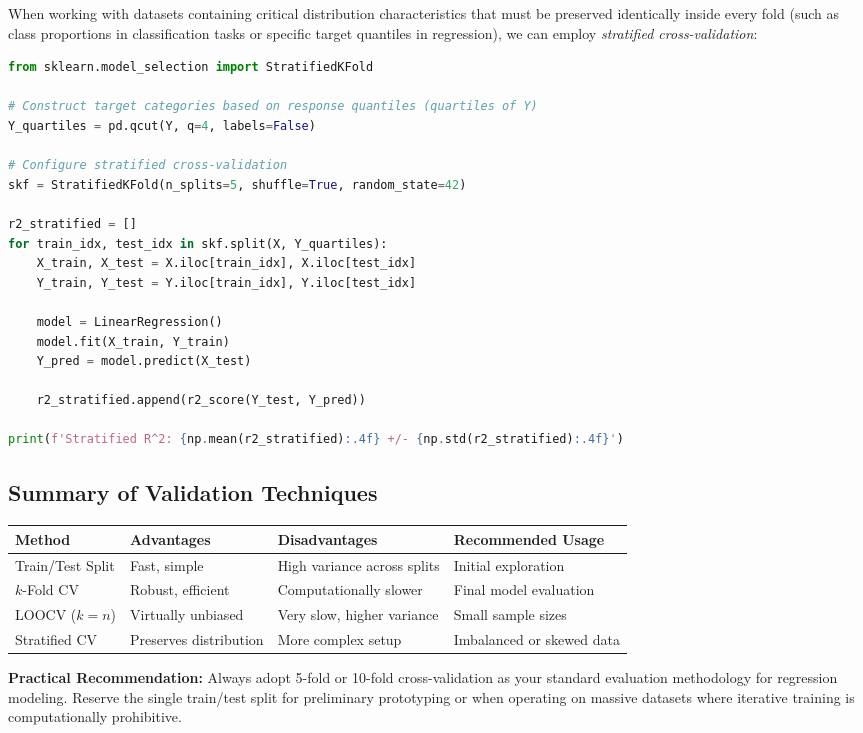 When working with datasets containing critical distribution characteristics that must be preserved identically inside every fold (such as class proportions in classification tasks or specific target quantiles in regression), we can employ \emph{stratified cross-validation}:

\begin{lstlisting}[language=Python]
from sklearn.model_selection import StratifiedKFold

# Construct target categories based on response quantiles (quartiles of Y)
Y_quartiles = pd.qcut(Y, q=4, labels=False)

# Configure stratified cross-validation
skf = StratifiedKFold(n_splits=5, shuffle=True, random_state=42)

r2_stratified = []
for train_idx, test_idx in skf.split(X, Y_quartiles):
    X_train, X_test = X.iloc[train_idx], X.iloc[test_idx]
    Y_train, Y_test = Y.iloc[train_idx], Y.iloc[test_idx]
    
    model = LinearRegression()
    model.fit(X_train, Y_train)
    Y_pred = model.predict(X_test)
    
    r2_stratified.append(r2_score(Y_test, Y_pred))

print(f'Stratified R^2: {np.mean(r2_stratified):.4f} +/- {np.std(r2_stratified):.4f}')
\end{lstlisting}

\subsection{Summary of Validation Techniques}

\begin{center}
	\begin{tabular}{|l|l|l|l|}\hline
		\textbf{Method} & \textbf{Advantages} & \textbf{Disadvantages} & \textbf{Recommended Usage} \\\hline
		Train/Test Split & Fast, simple & High variance across splits & Initial exploration \\\hline
		$k$-Fold CV & Robust, efficient & Computationally slower & Final model evaluation \\\hline
		LOOCV ($k=n$) & Virtually unbiased & Very slow, higher variance & Small sample sizes \\\hline
		Stratified CV & Preserves distribution & More complex setup & Imbalanced or skewed data \\\hline
	\end{tabular}
\end{center}

\begin{observacion}
	\textbf{Practical Recommendation:} Always adopt 5-fold or 10-fold cross-validation as your standard evaluation methodology for regression modeling. Reserve the single train/test split for preliminary prototyping or when operating on massive datasets where iterative training is computationally prohibitive.
\end{observacion}
